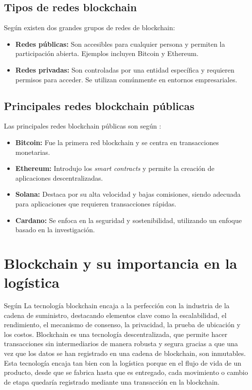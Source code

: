 \subsection{Tipos de redes blockchain}
Según \textcite{preukschat2017blockchain} existen dos grandes grupos de redes de blockchain:
\begin{itemize}
    \item \textbf{Redes públicas:} Son accesibles para cualquier persona y permiten la participación abierta. Ejemplos incluyen Bitcoin y Ethereum.
    \item \textbf{Redes privadas:} Son controladas por una entidad específica y requieren permisos para acceder. Se utilizan comúnmente en entornos empresariales.
\end{itemize}

\subsection{Principales redes blockchain públicas}
Las principales redes blockchain públicas son según \textcite{Top10RedesBlockchain}:
\begin{itemize}
    \item \textbf{Bitcoin:} Fue la primera red blockchain y se centra en transacciones monetarias.
    \item \textbf{Ethereum:} Introdujo los \textit{smart contracts} y permite la creación de aplicaciones descentralizadas.
    \item \textbf{Solana:} Destaca por su alta velocidad y bajas comisiones, siendo adecuada para aplicaciones que requieren transacciones rápidas.
    \item \textbf{Cardano:} Se enfoca en la seguridad y sostenibilidad, utilizando un enfoque basado en la investigación. 
\end{itemize}

\section{Blockchain y su importancia en la logística} 
 Según \textcite{blockChainsForSupplChainManagement} La tecnología blockchain encaja a la perfección con la industria de la cadena de suministro, destacando elementos clave como la escalabilidad, el rendimiento, el mecanismo de consenso, la privacidad, la prueba de ubicación y los costos.
 Blockchain es una tecnología descentralizada, que permite hacer transacciones sin intermediarios de manera robusta y segura gracias a que una vez que los datos se han registrado en una cadena de blockchain, son inmutables.
 Esta tecnología encaja tan bien con la logística porque en el flujo de vida de un producto, desde que se fabrica hasta que es entregado, cada movimiento o cambio de etapa quedaría registrado mediante una transacción en la blockchain.

